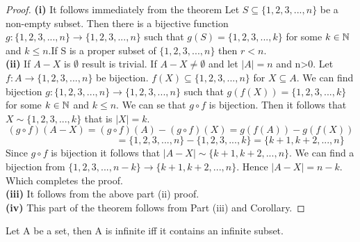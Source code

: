\documentclass[a4paper,english,12pt]{article}   	%
\begin{document}
\begin{proof}
\textbf{(i)} It follows immediately from the theorem Let $S \subseteq \{1,2,3,...,n\}$  be a non-empty subset. Then there is a bijective function $g \colon \{1,2,3,...,n\} \to \{1,2,3,...,n\}$ such that $g(S) =  \{1,2,3,...,k\}$ for some $k \in \mathbb{N}$ and $k \leq n$.If S is a proper subset of $\{1,2,3,...,n\}$ then $r < n$.\\
\textbf{(ii)} If $A - X$ is $\emptyset$ result is trivial. If $A - X \neq \emptyset$ and let $|A|=n$ and n>0. Let $f \colon A \to \{1,2,3,...,n\}$ be bijection. $f(X) \subseteq \{1,2,3,...,n\}$ for $X \subseteq A$. We can find bijection $g \colon \{1,2,3,...,n\} \to \{1,2,3,...,n\}$ such that $g(f(X)) =  \{1,2,3,...,k\}$ for some $k \in \mathbb{N}$ and $k \leq n$. We can se that $g \circ f$ is bijection. Then it follows that $X \sim  \{1,2,3,...,k\}$ that is $|X|=k$.\\
\[ (g \circ f)(A-X)=(g \circ f)(A)-(g \circ f)(X)= g(f(A))-g(f(X))\]
$\qquad \qquad \qquad \qquad \qquad \,\,\,\,\,\,\,\,   =\{1,2,3,...,n\}-\{1,2,3,...,k\} = \{k+1,k+2,...,n\}$\\
Since $g \circ f$ is bijection it follows that $|A-X| \sim \{k+1,k+2,...,n\}$. We can find a bijection from $\{1,2,3,...,n-k\} \to \{k+1,k+2,...,n\}$. Hence $|A-X|=n-k$.
Which completes the proof.\\
\textbf{(iii)} It follows from the above part (ii) proof.\\
\textbf{(iv)} This part of the theorem follows from Part (iii) and Corollary.

\end{proof}
\begin{cor} Let A be a set, then A is infinite iff it contains an infinite subset.
\end{cor}
\end{document}
